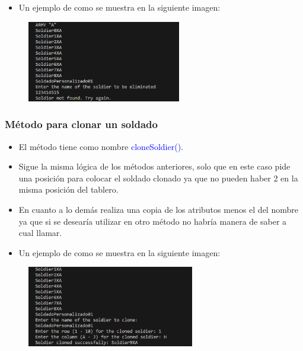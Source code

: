 \documentclass{article}
\begin{document}
\begin{itemize}\begin{itemize}\item Un ejemplo de como se muestra en la siguiente imagen:
\end{itemize}\end{itemize}
\begin{figure}[H]
    \centering
    \includegraphics[width=0.6\textwidth,keepaspectratio]{img/12deleteSoldier.png}
    \caption{}
\end{figure}


\subsubsection{Método para clonar un soldado}
\begin{itemize}
    \item El método tiene como nombre \textcolor{blue}{cloneSoldier()}.
    \item Sigue la misma lógica de los métodos anteriores, solo que en este caso pide una posición para colocar el soldado clonado ya que no pueden haber 2 en la misma posición del tablero.
    \item En cuanto a lo demás realiza una copia de los atributos menos el del nombre ya que si se desearía utilizar en otro método no habría manera de saber a cual llamar.
\end{itemize}


\begin{itemize}\begin{itemize}\item Un ejemplo de como se muestra en la siguiente imagen:
\end{itemize}\end{itemize}
\begin{figure}[H]
    \centering
    \includegraphics[width=0.65\textwidth,keepaspectratio]{img/12cloneSoldier.png}
    \caption{}
\end{figure}
\end{document}
